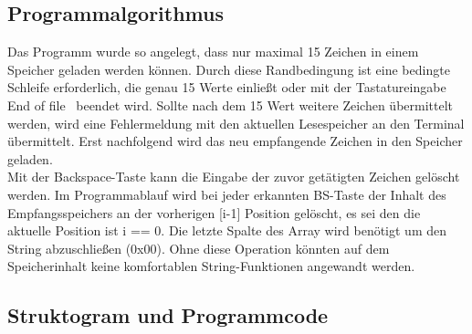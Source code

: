 	\subsection{Programmalgorithmus}
	Das Programm wurde so angelegt, dass nur maximal 15 Zeichen in einem Speicher geladen werden können. Durch diese Randbedingung ist eine bedingte Schleife erforderlich, die genau 15 Werte einließt oder mit der Tastatureingabe \glqq End of file\grqq~ beendet wird. Sollte nach dem 15 Wert weitere Zeichen übermittelt werden, wird eine Fehlermeldung mit den aktuellen Lesespeicher an den Terminal übermittelt. Erst nachfolgend wird das neu empfangende Zeichen in den Speicher geladen.\\
	Mit der Backspace-Taste kann die Eingabe der zuvor getätigten Zeichen gelöscht werden. Im Programmablauf wird bei jeder erkannten BS-Taste der Inhalt des Empfangsspeichers an der vorherigen [i-1] Position gelöscht, es sei den die aktuelle Position ist i == 0. Die letzte Spalte des Array wird benötigt um den String abzuschließen (0x00). Ohne diese Operation könnten auf dem Speicherinhalt keine komfortablen String-Funktionen angewandt werden.


	\newpage
	
	\subsection{Struktogram und Programmcode}
	
